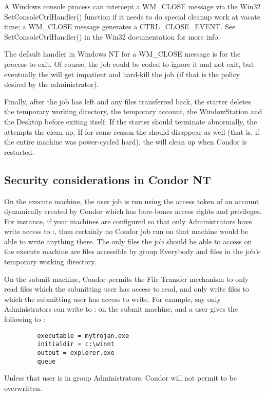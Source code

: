 \Note A Windows console process can intercept a WM\_CLOSE message
via the Win32 SetConsoleCtrlHandler() function if it needs to do special
cleanup work at vacate time; a WM\_CLOSE message
generates a CTRL\_CLOSE\_EVENT.  See SetConsoleCtrlHandler() in the Win32
documentation for more info.

\Note The default handler in Windows NT for a WM\_CLOSE message is for the
process to exit.  Of course, the job could be coded to ignore it and not
exit, but eventually the  will get impatient and hard-kill
the job (if that is the policy desired by the administrator).

Finally, after the job has left and any files transferred back,
the starter
deletes the temporary working directory, the temporary
account, the WindowStation and the Desktop before exiting itself.
If the starter should terminate abnormally, the 
attempts the clean up.
If for some reason the  should disappear as well
(that is, if the entire machine was power-cycled hard),
the  will clean up when Condor is restarted.

\subsection{Security considerations in Condor NT}


On the execute machine, the user job is run using the access token of an
account dynamically created by Condor which has bare-bones access rights and
privileges.  For instance, if your machines are configured so that only
Administrators have write access to
\verb@C:\WINNT@,
then certainly no
Condor job run on that machine would be able to write anything there.  The
only files the job should be able to access on the execute machine are files
accessible by group Everybody and files in the job's temporary working
directory.

On the submit machine, Condor permits the File Transfer mechanism to only
read files which the submitting user has access to read, and only write
files to which the submitting user has access to write.  For example, say
only Administrators can write to 
\verb@C:\WINNT@
on the submit machine,
and a user gives the following to  :
\begin{verbatim}
         executable = mytrojan.exe
         initialdir = c:\winnt
         output = explorer.exe
         queue
\end{verbatim}
Unless that user is in group Administrators, Condor will not permit
 to be overwritten.  

